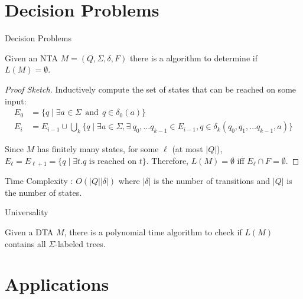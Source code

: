 \documentclass[10pt,svgnames,fragile]{beamer}
\begin{document}
\section{Decision Problems}

\begin{frame}{Decision Problems}
  \begin{theorem}
    Given an NTA $M = (Q, \Sigma, \delta, F)$ there is a algorithm to determine if $L(M) = \emptyset$.
  \end{theorem}
  
  \pause
  
  \begin{proof}[Proof Sketch]
    Inductively compute the set of states that can be reached on some input:
    \begin{align*}
      E_0 &= \{q \mid \exists a \in \Sigma \ \ \text{and} \ \ q \in \delta_0(a)\} \\
      E_i &= E_{i-1} \cup \bigcup_k \{q \mid \exists a \in \Sigma ,\exists \  q_0, \ldots q_{k-1} \in E_{i-1} ,  q \in \delta_k(q_0, q_1, \ldots q_{k-1}, a)\}
    \end{align*}
    
    Since $M$ has finitely many states, for some $\ell$ (at most $|Q|$), $E_\ell = E_{\ell+1} = \{q \mid \exists t. q \text{ is reached on } t\}$.
    Therefore, $L(M) = \emptyset$ iff $E_\ell \cap F = \emptyset$.
  \end{proof}
    \pause 
    \begin{block}{Time Complexity : $O(|Q||\delta|)$}
    where $| \delta |$  is the number of transitions and $|Q|$ is the number of states.
    \end{block}
\end{frame}

\begin{frame}{Universality}
      \begin{corollary}
    Given a DTA $M$, there is a polynomial time algorithm to check if $L(M)$ contains all $\Sigma$-labeled trees.
  \end{corollary}
\end{frame}

\section{Applications}
\end{document}
